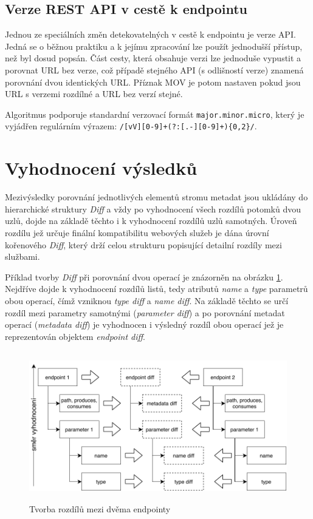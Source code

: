 \documentclass[czech,DP]{thesiskiv}
\begin{document}
\subsection{Verze REST API v cestě k endpointu}	
\label{sec:api-path-version}

Jednou ze speciálních změn detekovatelných v cestě k endpointu je verze API. Jedná se o běžnou praktiku \cite{restApiVersion} a k jejímu zpracování lze použít jednodušší přístup, než byl dosud popsán. Část cesty, která obsahuje verzi lze jednoduše vypustit a porovnat URL bez verze, což případě stejného API (s odlišností verze) znamená porovnání dvou identických URL. Příznak MOV je potom nastaven pokud jsou URL s verzemi rozdílné a URL bez verzí stejné.

Algoritmus podporuje standardní verzovací formát \verb|major.minor.micro|, který je vyjádřen regulárním výrazem: \verb|/[vV][0-9]+(?:[.-][0-9]+){0,2}/|.

\section{Vyhodnocení výsledků}

Mezivýsledky porovnání jednotlivých elementů stromu metadat jsou ukládány do hierarchické struktury \textit{Diff} a vždy po vyhodnocení všech rozdílů potomků dvou uzlů, dojde na základě těchto i k vyhodnocení rozdílů uzlů samotných. Úroveň rozdílu jež určuje finální kompatibilitu webových služeb je dána úrovní kořenového \textit{Diff}, který drží celou strukturu popisující detailní rozdíly mezi službami. 

Příklad tvorby \textit{Diff} při porovnání dvou operací je znázorněn na obrázku \ref{fig:compatibility-creation}. Nejdříve dojde k vyhodnocení rozdílů listů, tedy atributů \textit{name} a \textit{type} parametrů obou operací, čímž vzniknou \textit{type diff} a \textit{name diff}. Na základě těchto se určí rozdíl mezi parametry samotnými (\textit{parameter diff}) a po porovnání metadat operací (\textit{metadata diff}) je vyhodnocen i výsledný rozdíl obou operací jež je reprezentován objektem \textit{endpoint diff}.

\begin{figure}[h]
	\centering
	\includegraphics[height=6.5cm]{compatibility-construction}
	\caption{Tvorba rozdílů mezi dvěma endpointy}
	\label{fig:compatibility-creation}
\end{figure}
\end{document}
